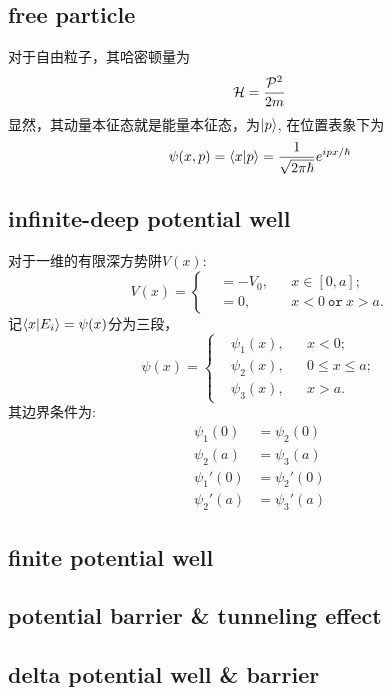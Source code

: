 \subsection{free particle}
对于自由粒子，其哈密顿量为
\begin{equation}
    \mathcal{H}=\frac{\mathcal{P}^2}{2m}
\end{equation}
显然，其动量本征态就是能量本征态，为$\left|p\right>$, 在位置表象下为
\begin{equation}
    \psi(x,p)=\left<x\middle|p\right>=\frac{1}{\sqrt{2\pi\hbar}} e^{ipx/\hbar}
\end{equation}
\subsection{infinite-deep potential well}
对于一维的有限深方势阱$V(x)$:
\begin{equation}
    V(x)=\left\lbrace\begin{aligned}
        &=-V_0, && x\in[0,a];\\
        &=0, && x <0 \ \mathtt{or}\  x>a.
    \end{aligned}\right.
\end{equation}
记$\left<x\middle|E_i\right>=\psi(x)$分为三段，
\begin{equation}
    \psi(x)=\left\lbrace\begin{aligned}
        &\psi_1(x),&&x<0;\\
        &\psi_2(x),&&0\leq x\leq a;\\
        &\psi_3(x),&&x>a.
    \end{aligned}\right.
\end{equation}
其边界条件为: 
\begin{align}
    \psi_1(0)&=\psi_2(0)\\
    \psi_2(a)&=\psi_3(a)\\
    \psi_1'(0)&=\psi_2'(0)\\
    \psi_2'(a)&=\psi_3'(a)
\end{align}
\subsection{finite potential well}
\subsection{potential barrier \& tunneling effect}
\subsection{delta potential well \& barrier}
